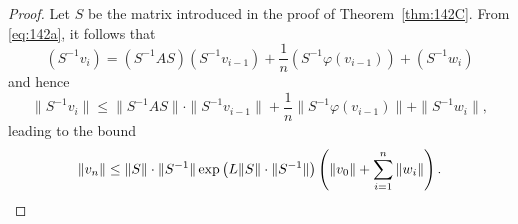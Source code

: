 \begin{proof}
Let \( S \) be the matrix introduced in the proof of Theorem~\ref{thm:142C}. From \eqref{eq:142a}, it follows that
\[
(S^{-1} v_i) = (S^{-1} A S)(S^{-1} v_{i-1}) + \frac{1}{n} (S^{-1} \varphi(v_{i-1})) + (S^{-1} w_i)
\]
and hence
\[
\|S^{-1} v_i\| \leq \|S^{-1} A S\| \cdot \|S^{-1} v_{i-1}\| + \frac{1}{n} \|S^{-1} \varphi(v_{i-1})\| + \|S^{-1} w_i\|,
\]
leading to the bound
\[
\|v_n\| \leq \|S\| \cdot \|S^{-1}\| \exp\left( L \|S\| \cdot \|S^{-1}\| \right) \left( \|v_0\| + \sum_{i=1}^n \|w_i\| \right). \qedhere
\]
\end{proof}

